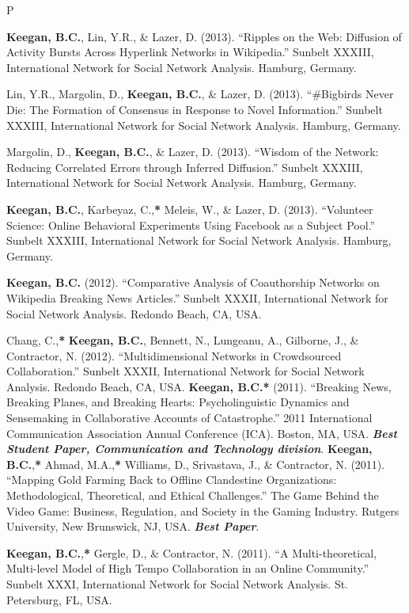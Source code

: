 \documentclass{cv}
\begin{document}
\begin{entries}{P}
		\item \textbf{Keegan, B.C.}, Lin, Y.R., \& Lazer, D. (2013). ``Ripples on the Web: Diffusion of Activity Bursts Across Hyperlink Networks in Wikipedia.'' Sunbelt XXXIII, International Network for Social Network Analysis. Hamburg, Germany.
		\item Lin, Y.R., Margolin, D., \textbf{Keegan, B.C.}, \& Lazer, D. (2013). ``\#Bigbirds Never Die: The Formation of Consensus in Response to Novel Information.'' Sunbelt XXXIII, International Network for Social Network Analysis. Hamburg, Germany.
		\item Margolin, D., \textbf{Keegan, B.C.}, \& Lazer, D. (2013). ``Wisdom of the Network: Reducing Correlated Errors through Inferred Diffusion.'' Sunbelt XXXIII, International Network for Social Network Analysis. Hamburg, Germany.
		\item \textbf{Keegan, B.C.}, Karbeyaz, C.,\textbf{*} Meleis, W., \& Lazer, D. (2013). ``Volunteer Science: Online Behavioral Experiments Using Facebook as a Subject Pool.'' Sunbelt XXXIII, International Network for Social Network Analysis. Hamburg, Germany.
		\item \textbf{Keegan, B.C.} (2012). ``Comparative Analysis of Coauthorship Networks on Wikipedia Breaking News Articles.'' Sunbelt XXXII, International Network for Social Network Analysis. Redondo Beach, CA, USA.
		\item Chang, C.,\textbf{*} \textbf{Keegan, B.C.}, Bennett, N., Lungeanu, A., Gilborne, J., \& Contractor, N. (2012). ``Multidimensional Networks in Crowdsourced Collaboration.'' Sunbelt XXXII, International Network for Social Network Analysis. Redondo Beach, CA, USA.
		\awarditem \textbf{Keegan, B.C.}\textbf{*} (2011). ``Breaking News, Breaking Planes, and Breaking Hearts: Psycholinguistic Dynamics and Sensemaking in Collaborative Accounts of Catastrophe.'' 2011 International Communication Association Annual Conference (ICA). Boston, MA, USA. \textbf{\textit{Best Student Paper, Communication and Technology division}}.
		\awarditem \textbf{Keegan, B.C.},\textbf{*} Ahmad, M.A.,\textbf{*} Williams, D., Srivastava, J., \& Contractor, N. (2011). ``Mapping Gold Farming Back to Offline Clandestine Organizations: Methodological, Theoretical, and Ethical Challenges.'' The Game Behind the Video Game: Business, Regulation, and Society in the Gaming Industry. Rutgers University, New Brunswick, NJ, USA. \textbf{\textit{Best Paper}}.
		\item \textbf{Keegan, B.C.},\textbf{*} Gergle, D., \& Contractor, N. (2011). ``A Multi-theoretical, Multi-level Model of High Tempo Collaboration in an Online Community.'' Sunbelt XXXI, International Network for Social Network Analysis. St. Petersburg, FL, USA.

\end{entries}
\end{document}
